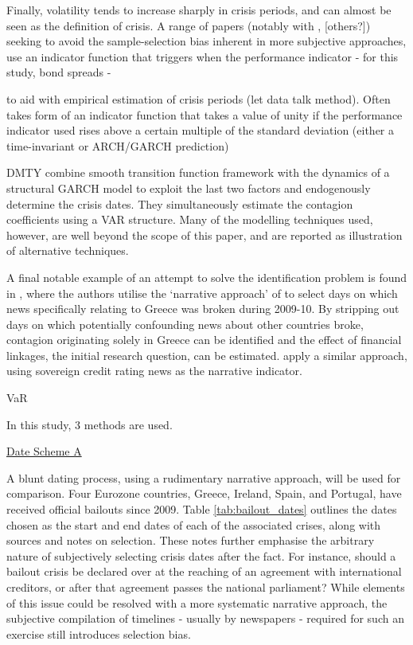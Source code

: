 \documentclass[../base.tex]{subfiles}
\begin{document}
Finally, volatility tends to increase sharply in crisis periods, and can almost be seen as the definition of crisis. A range of papers (notably with \cite{eichengreen1996contagious}, [others?]) seeking to avoid the sample-selection bias inherent in more subjective approaches, use an indicator function that triggers when the performance indicator - for this study, bond spreads - 

to aid with empirical estimation of crisis periods (let data talk method). Often takes form of an indicator function that takes a value of unity if the performance indicator used rises above a certain multiple of the standard deviation (either a time-invariant or ARCH/GARCH prediction)

DMTY combine smooth transition function framework with the dynamics of a structural GARCH model to exploit the last two factors and endogenously determine the crisis dates. They simultaneously estimate the contagion coefficients using a VAR structure. Many of the modelling techniques used, however, are well beyond the scope of this paper, and are reported as illustration of alternative techniques.

A final notable example of an attempt to solve the identification problem is found in \cite{brutti2012transmission}, where the authors utilise the `narrative approach' of \cite{romer1989does} to select days on which news specifically relating to Greece was broken during 2009-10. By stripping out days on which potentially confounding news about other countries broke, contagion originating solely in Greece can be identified and the effect of financial linkages, the initial research question, can be estimated. \cite{arezki2011sovereign} apply a similar approach, using sovereign credit rating news as the narrative indicator. 




\cite{metiu2012sovereign} VaR

In this study, 3 methods are used. 

\underline{Date Scheme A}

A blunt dating process, using a rudimentary narrative approach, will be used for comparison. Four Eurozone countries, Greece, Ireland, Spain, and Portugal, have received official bailouts since 2009. Table \ref{tab:bailout_dates} outlines the dates chosen as the start and end dates of each of the associated crises, along with sources and notes on selection. These notes further emphasise the arbitrary nature of subjectively selecting crisis dates after the fact. For instance, should a bailout crisis be declared over at the reaching of an agreement with international creditors, or after that agreement passes the national parliament? While elements of this issue could be resolved with a more systematic narrative approach, the subjective compilation of timelines - usually by newspapers - required for such an exercise still introduces selection bias. 
\end{document}
